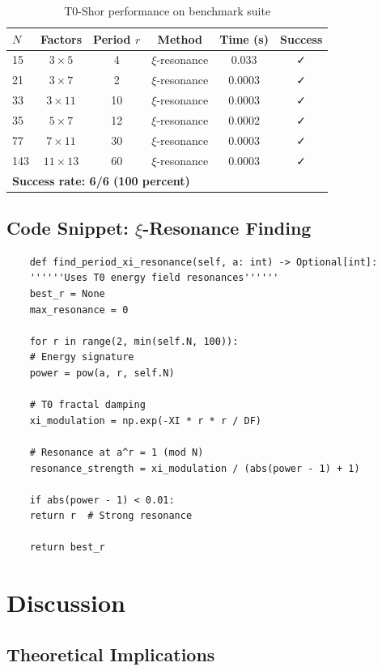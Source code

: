 \begin{table}[h]
	\centering
	\caption{T0-Shor performance on benchmark suite}
	\label{tab:benchmark}
	\begin{tabular}{@{}lccccc@{}}
		\toprule
		$N$ & Factors & Period $r$ & Method & Time (s) & Success \\
		\midrule
		15 & $3 \times 5$ & 4 & $\xi$-resonance & 0.033 & ✓ \\
		21 & $3 \times 7$ & 2 & $\xi$-resonance & 0.0003 & ✓ \\
		33 & $3 \times 11$ & 10 & $\xi$-resonance & 0.0003 & ✓ \\
		35 & $5 \times 7$ & 12 & $\xi$-resonance & 0.0002 & ✓ \\
		77 & $7 \times 11$ & 30 & $\xi$-resonance & 0.0003 & ✓ \\
		143 & $11 \times 13$ & 60 & $\xi$-resonance & 0.0003 & ✓ \\
		\midrule
		\multicolumn{5}{l}{\textbf{Success rate: 6/6 (100 percent)}} \\
		\bottomrule
	\end{tabular}
\end{table}

\subsection{Code Snippet: $\xi$-Resonance Finding}

\begin{lstlisting}
	def find_period_xi_resonance(self, a: int) -> Optional[int]:
	''''''Uses T0 energy field resonances''''''
	best_r = None
	max_resonance = 0
	
	for r in range(2, min(self.N, 100)):
	# Energy signature
	power = pow(a, r, self.N)
	
	# T0 fractal damping
	xi_modulation = np.exp(-XI * r * r / DF)
	
	# Resonance at a^r = 1 (mod N)
	resonance_strength = xi_modulation / (abs(power - 1) + 1)
	
	if abs(power - 1) < 0.01:
	return r  # Strong resonance
	
	return best_r
\end{lstlisting}

\section{Discussion}

\subsection{Theoretical Implications}

